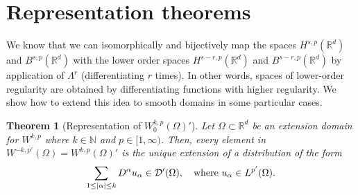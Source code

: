 \documentclass[
    a4paper,
    DIV=14,
    abstract=true,
    numbers=noenddot
]
{scrartcl}
\newtheorem{theorem}{Theorem}[section]
\theoremstyle{definition}
\newcommand{\N}{\mathbb{N}}
\newcommand{\R}{\mathbb{R}}
\newcommand{\Dd}{\mathcal{D}}
\begin{document}
\section{Representation theorems}
We know that we can isomorphically and bijectively map the spaces $H^{s,p}(\R^d )$ and $B^{s,p}(\R^d )$ with the lower order spaces $H^{s-r,p}(\R^d )$ and $B^{s-r,p}(\R^d )$ by application of $\Lambda ^r$ (differentiating $r$ times). In other words, spaces of lower-order regularity are obtained by differentiating functions with higher regularity. We show how to extend this idea to smooth domains in some particular cases.

\begin{theorem}[Representation of $W_0^{k,p}(\Omega )'$]\label{riesz representation}
    Let $\Omega \subset \R^d$ be an extension domain for $W^{k,p}$ where   $k \in \N$ and $p \in [1,\infty)$. Then, every element in $W^{-k,p'}(\Omega )=W^{k,p}(\Omega )'$ is the unique extension of a distribution  of the form
    \begin{align*}
        \sum_{1\leq\abs{\alpha}\leq k} D^\alpha u_\alpha\in \Dd'(\Omega ),\quad \text{where }    u_\alpha \in L^{p'}(\Omega ).
    \end{align*}

\end{theorem}
\end{document}
